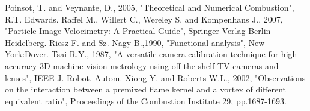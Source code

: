 \documentclass[12pt,a4paper]{article}
\begin{document}
\begin{thebibliography}{1}
 Poinsot, T. and Veynante, D., 2005, "Theoretical and Numerical Combustion",  R.T. Edwards.
 Raffel M., Willert C., Wereley S. and Kompenhans J., 2007, "Particle Image Velocimetry: A Practical Guide", Springer-Verlag Berlin Heidelberg.
 Riesz F. and Sz.-Nagy B.,1990, "Functional analysis", New York:Dover.
 Tsai R.Y., 1987, "A versatile camera calibration technique for high-accuracy 3D machine vision metrology using off-the-shelf TV cameras and lenses", IEEE J. Robot. Autom.
 Xiong Y. and Roberts W.L., 2002, "Observations on the interaction between a premixed flame kernel and a vortex of different equivalent ratio", Proceedings of the Combustion Institute 29, pp.1687-1693.

\end{thebibliography}
\end{document}
